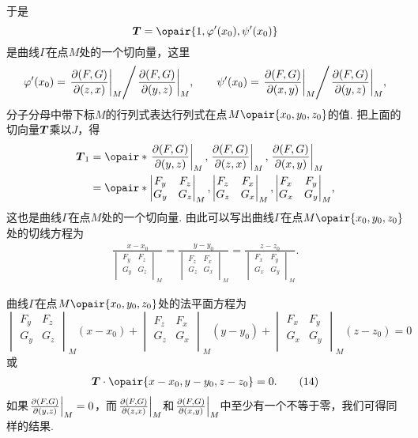 于是\[
\mat{T} = \opair{1,\varphi'(x_0),\psi'(x_0)}
\]是曲线\(\Gamma\)在点\(M\)处的一个切向量，这里\[
\varphi'(x_0) = {\eval{\jacobi{F,G}{z,x}}_M}\Bigg/{\eval{\jacobi{F,G}{y,z}}_M},
\qquad
\psi'(x_0) = {\eval{\jacobi{F,G}{x,y}}_M}\Bigg/{\eval{\jacobi{F,G}{y,z}}_M},
\]分子分母中带下标\(M\)的行列式表达行列式在点\(M\opair{x_0,y_0,z_0}\)的值.
把上面的切向量\(\boldsymbol{T}\)乘以\(J\)，得\begin{align*}
\mat{T}_1 &= \opair*{
 \eval{\jacobi{F,G}{y,z}}_M,
 \eval{\jacobi{F,G}{z,x}}_M,
 \eval{\jacobi{F,G}{x,y}}_M
} \\
&= \opair*{
\begin{vmatrix}
F_y & F_z \\
G_y & G_z \\
\end{vmatrix}_M,
\begin{vmatrix}
F_z & F_x \\
G_z & G_x \\
\end{vmatrix}_M,
\begin{vmatrix}
F_x & F_y \\
G_x & G_y \\
\end{vmatrix}_M
},
\end{align*}
这也是曲线\(\Gamma\)在点\(M\)处的一个切向量.
由此可以写出曲线\(\Gamma\)在点\(M\opair{x_0,y_0,z_0}\)处的切线方程为\begin{gather}
\frac{x-x_0}{\begin{vmatrix}
F_y & F_z \\
G_y & G_z \\
\end{vmatrix}_M}
=\frac{y-y_0}{\begin{vmatrix}
F_z & F_x \\
G_z & G_x \\
\end{vmatrix}_M}
=\frac{z-z_0}{\begin{vmatrix}
F_x & F_y \\
G_x & G_y \\
\end{vmatrix}_M}.
\tag{13}
\end{gather}

曲线\(\Gamma\)在点\(M\opair{x_0,y_0,z_0}\)处的法平面方程为\[
\begin{vmatrix}
F_y & F_z \\
G_y & G_z \\
\end{vmatrix}_M
(x-x_0)
+ \begin{vmatrix}
F_z & F_x \\
G_z & G_x \\
\end{vmatrix}_M
(y-y_0)
+ \begin{vmatrix}
F_x & F_y \\
G_x & G_y \\
\end{vmatrix}_M
(z-z_0) = 0
\]或\begin{gather}
\mat{T}\cdot\opair{x-x_0,y-y_0,z-z_0}=0.
\tag{14}
\end{gather}
如果\(\eval{\jacobi{F,G}{y,z}}_M = 0\)，而\(\eval{\jacobi{F,G}{z,x}}_M\)和\(\eval{\jacobi{F,G}{x,y}}_M\)中至少有一个不等于零，我们可得同样的结果.

